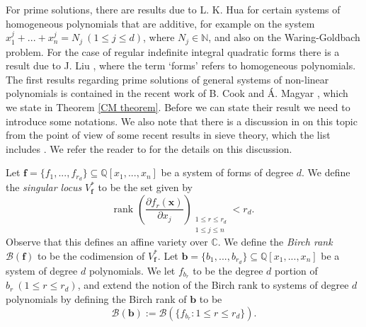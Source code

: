 \documentclass[12pt]{amsart}
\theoremstyle{definition}
\theoremstyle{remark}
\numberwithin{equation}{section}
\begin{document}
For prime solutions, there are results due to L. K. Hua \cite{H} for certain systems of homogeneous polynomials that are additive, for example
on the system $x_1^j + ... + x_n^j = N_j \ (1 \leq j \leq d)$, where $N_j \in \mathbb{N}$, and also on the Waring-Goldbach problem.
For the case of regular indefinite integral quadratic forms there is a result due to J. Liu \cite{L},
where the term `forms' refers to homogeneous polynomials. The first results regarding prime solutions of general systems of non-linear polynomials is contained in the recent work of B. Cook and \'{A}. Magyar \cite{CM}, which we state in Theorem \ref{CM theorem}.
Before we can state their result we need to introduce some notations.
We also note that there is a discussion in \cite{CM} on this topic from the point of view of some recent results in sieve theory,
which the list includes \cite{BGS, DRS, LS}. We refer the reader to \cite{CM} for the details on this discussion.

Let $\mathbf{f} = \{f_1, ..., f_{r_d}  \} \subseteq \mathbb{Q}[x_1, ..., x_n]$ be a system of forms of degree $d$.
We define the \emph{singular locus} $V_{\mathbf{f}}^*$ to be the set given by
$$
\text{rank } \left( \frac{ \partial f_r(\mathbf{x}) }{ \partial x_j }\right)_{ \substack{ 1 \leq r \leq r_d  \\ 1 \leq j \leq n } }  < r_d.
$$
Observe that this defines an affine variety over $\mathbb{C}$.
We define the \textit{Birch rank} $\mathcal{B} (\mathbf{f})$ to be the codimension of $V_{\mathbf{f}}^*$.
Let $\mathbf{b} = \{ b_1, ..., b_{r_d} \} \subseteq \mathbb{Q}[x_1,..., x_n]$ be a system of degree $d$ polynomials.
We let $f_{b_r}$ to be the degree $d$ portion of $b_r \ (1 \leq r \leq r_d)$, and extend the notion of the Birch rank to systems of degree $d$ polynomials by
defining the Birch rank of $\mathbf{b}$ to be
$$
\mathcal{B} (\mathbf{b}) :=  \mathcal{B} ( \{ f_{b_r} : 1 \leq r \leq r_d  \}).
$$
\end{document}
